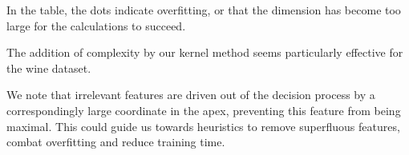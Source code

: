 \documentclass[oneside,english]{amsart}
\numberwithin{equation}{section}
\numberwithin{figure}{section}
\theoremstyle{plain}
\theoremstyle{definition}
\theoremstyle{plain}
\theoremstyle{remark}
\theoremstyle{plain}
\theoremstyle{definition}
\theoremstyle{definition}
\begin{document}
In the table, the dots indicate overfitting, or that the dimension has become too large for the calculations to succeed.

The addition of complexity by our kernel method seems particularly effective for the wine dataset.

We note that irrelevant features are driven out of the decision process by a correspondingly large coordinate in the apex, preventing this feature from being maximal. This could guide us towards heuristics to remove superfluous features, combat overfitting and reduce training time.

\newpage


\end{document}
